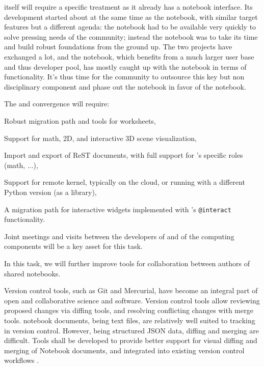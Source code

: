 \begin{workpackage}
\begin{tasklist}
\begin{task}[title=Uniform notebook interface for all interactive components,id=ipython-kernels,lead=PS]
  \Sage itself will require a specific treatment as it already has a
  notebook interface. Its development started about at the same time
  as the \Jupyter notebook, with similar target features but a
  different agenda: the \Sage notebook had to be available very quickly
  to solve pressing needs of the \Sage community; instead the \Jupyter
  notebook was to take its time and build robust foundations from the
  ground up. The two projects have exchanged a lot, and the \Jupyter
  notebook, which benefits from a much larger user base and thus
  developer pool, has mostly caught up with the \Sage notebook in terms
  of functionality. It's thus time for the \Sage community to outsource
  this key but non disciplinary component and phase out the \Sage
  notebook in favor of the \Jupyter notebook.

  The \Sage and \Jupyter convergence  will
  require:
  \begin{compactitem}
  \item Robust migration path and tools for \Sage worksheets,
  \item Support for math, 2D, and interactive 3D scene visualization,
  \item Import and export of ReST documents, with full support for
    \Sage's specific roles (math, ...),
  \item Support for remote \Sage kernel, typically on the cloud, or
    running with a different Python version (\Sage as a library),
  \item A migration path for interactive widgets implemented with
    \Sage's \texttt{@interact} functionality.
  \end{compactitem}

  Joint meetings and visits between the developers of \Jupyter and of
  the computing components will be a key asset for this task.

\end{task}

\begin{task}[id=notebook-collab,title=Notebook improvements for collaboration,lead=SR]
  In this task, we will further improve tools for collaboration between
  authors of shared \Jupyter notebooks.

  Version control tools, such as Git and Mercurial, have become an integral part of open and
  collaborative science and software. Version control tools allow reviewing proposed changes via
  diffing tools, and resolving conflicting changes with merge tools. \Jupyter notebook documents,
  being text files, are relatively well suited to tracking in version control. However, being
  structured JSON data, diffing and merging are difficult. Tools shall be developed to provide
  better support for visual diffing and merging of Notebook documents, and integrated into existing
  version control workflows .


\end{task}
\end{tasklist}
\end{workpackage}
